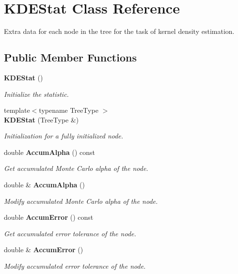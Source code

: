 \section{K\+D\+E\+Stat Class Reference}
\label{classmlpack_1_1kde_1_1KDEStat}


Extra data for each node in the tree for the task of kernel density estimation.  


\subsection*{Public Member Functions}
\begin{DoxyCompactItemize}
\item 
\textbf{ K\+D\+E\+Stat} ()
\begin{DoxyCompactList}\small\item\em Initialize the statistic. \end{DoxyCompactList}\item 
{\footnotesize template$<$typename Tree\+Type $>$ }\\\textbf{ K\+D\+E\+Stat} (Tree\+Type \&)
\begin{DoxyCompactList}\small\item\em Initialization for a fully initialized node. \end{DoxyCompactList}\item 
double \textbf{ Accum\+Alpha} () const
\begin{DoxyCompactList}\small\item\em Get accumulated Monte Carlo alpha of the node. \end{DoxyCompactList}\item 
double \& \textbf{ Accum\+Alpha} ()
\begin{DoxyCompactList}\small\item\em Modify accumulated Monte Carlo alpha of the node. \end{DoxyCompactList}\item 
double \textbf{ Accum\+Error} () const
\begin{DoxyCompactList}\small\item\em Get accumulated error tolerance of the node. \end{DoxyCompactList}\item 
double \& \textbf{ Accum\+Error} ()
\begin{DoxyCompactList}\small\item\em Modify accumulated error tolerance of the node. \end{DoxyCompactList}\item 

\end{DoxyCompactItemize}
